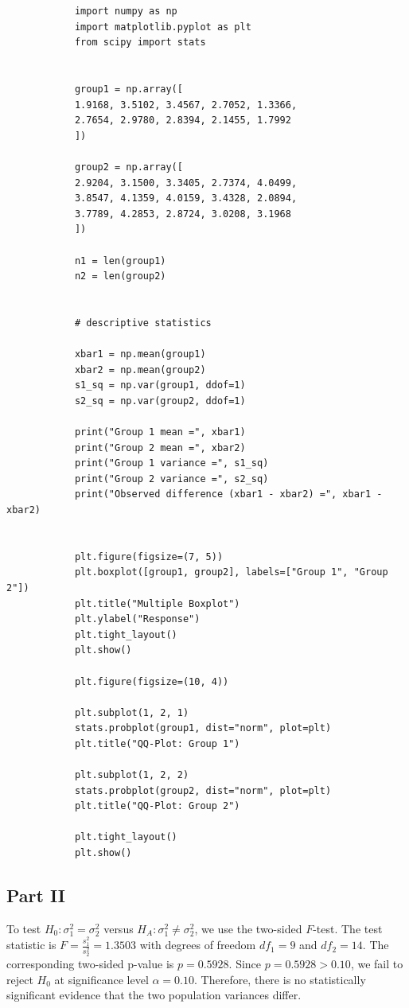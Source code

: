 \documentclass[letterpaper]{article}
\begin{document}
		\begin{lstlisting}
			import numpy as np
			import matplotlib.pyplot as plt
			from scipy import stats
			
			
			group1 = np.array([
			1.9168, 3.5102, 3.4567, 2.7052, 1.3366,
			2.7654, 2.9780, 2.8394, 2.1455, 1.7992
			])
			
			group2 = np.array([
			2.9204, 3.1500, 3.3405, 2.7374, 4.0499,
			3.8547, 4.1359, 4.0159, 3.4328, 2.0894,
			3.7789, 4.2853, 2.8724, 3.0208, 3.1968
			])
			
			n1 = len(group1)
			n2 = len(group2)
			
			
			# descriptive statistics
			
			xbar1 = np.mean(group1)
			xbar2 = np.mean(group2)
			s1_sq = np.var(group1, ddof=1)
			s2_sq = np.var(group2, ddof=1)
			
			print("Group 1 mean =", xbar1)
			print("Group 2 mean =", xbar2)
			print("Group 1 variance =", s1_sq)
			print("Group 2 variance =", s2_sq)
			print("Observed difference (xbar1 - xbar2) =", xbar1 - xbar2)
			
			
			plt.figure(figsize=(7, 5))
			plt.boxplot([group1, group2], labels=["Group 1", "Group 2"])
			plt.title("Multiple Boxplot")
			plt.ylabel("Response")
			plt.tight_layout()
			plt.show()
			
			plt.figure(figsize=(10, 4))
			
			plt.subplot(1, 2, 1)
			stats.probplot(group1, dist="norm", plot=plt)
			plt.title("QQ-Plot: Group 1")
			
			plt.subplot(1, 2, 2)
			stats.probplot(group2, dist="norm", plot=plt)
			plt.title("QQ-Plot: Group 2")
			
			plt.tight_layout()
			plt.show()
		\end{lstlisting}
		\clearpage
		
		\subsection{Part II}
		
		To test
		$H_0:\sigma_1^2=\sigma_2^2$
		versus
		$H_A:\sigma_1^2\ne\sigma_2^2$,
		we use the two-sided $F$-test. The test statistic is
		$F=\frac{s_1^2}{s_2^2}=1.3503$
		with degrees of freedom $df_1=9$ and $df_2=14$.
		The corresponding two-sided p-value is
		$p=0.5928$. Since $p=0.5928>0.10$, we fail to reject $H_0$ at significance level
		$\alpha=0.10$.
		Therefore, there is no statistically significant evidence that the two
		population variances differ.
		
\end{document}
